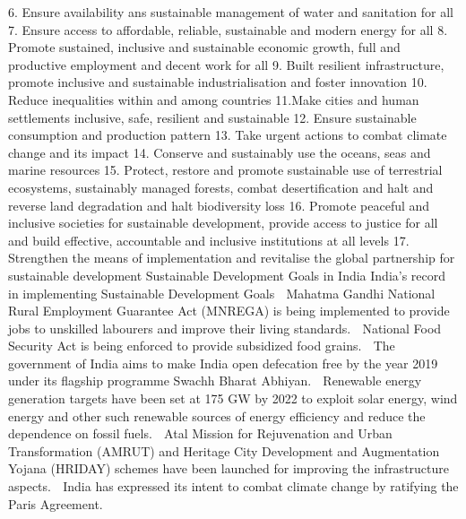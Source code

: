 6. Ensure availability ans sustainable management of water and
sanitation for all
7. Ensure access to affordable, reliable, sustainable and modern
energy for all
8. Promote sustained, inclusive and sustainable economic growth, full
and productive employment and decent work for all
9. Built resilient infrastructure, promote inclusive and sustainable
industrialisation and foster innovation
10. Reduce inequalities within and among countries
11.Make cities and human settlements inclusive, safe, resilient and
sustainable
12. Ensure sustainable consumption and production pattern
13. Take urgent actions to combat climate change and its impact
14. Conserve and sustainably use the oceans, seas and marine
resources
15. Protect, restore and promote sustainable use of terrestrial
ecosystems, sustainably managed forests, combat desertification
and halt and reverse land degradation and halt biodiversity loss
16. Promote peaceful and inclusive societies for sustainable
development, provide access to justice for all and build effective,
accountable and inclusive institutions at all levels
17. Strengthen the means of implementation and revitalise the
global partnership for sustainable development
Sustainable Development Goals in India
India’s record in implementing Sustainable Development Goals
 Mahatma Gandhi National Rural Employment Guarantee Act
(MNREGA) is being implemented to provide jobs to unskilled
labourers and improve their living standards.
 National Food Security Act is being enforced to provide
subsidized food grains.
 The government of India aims to make India open defecation free
by the year 2019 under its flagship programme Swachh Bharat
Abhiyan.
 Renewable energy generation targets have been set at 175 GW by
2022 to exploit solar energy, wind energy and other such
renewable sources of energy efficiency and reduce the
dependence on fossil fuels.
 Atal Mission for Rejuvenation and Urban Transformation
(AMRUT) and Heritage City Development and Augmentation
Yojana (HRIDAY) schemes have been launched for improving the
infrastructure aspects.
 India has expressed its intent to combat climate change by
ratifying the Paris Agreement.
